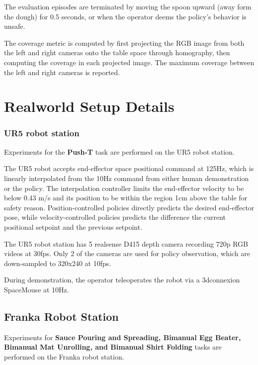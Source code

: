 \documentclass[Afour,sageh,times]{sagej}
\begin{document}
The evaluation episodes are terminated by moving the spoon upward (away form the dough) for 0.5 seconds, or when the operator deems the policy's behavior is unsafe.

The coverage metric is computed by first projecting the RGB image from both the left and right cameras onto the table space through homography, then computing the coverage in each projected image. The maximum coverage between the left and right cameras is reported.






\section{Realworld Setup Details}

\subsubsection{UR5 robot station}
\label{sec:ur5_setup}
Experiments for the \textbf{Push-T} task are performed on the UR5 robot station.

The UR5 robot accepts end-effector space positional command at 125Hz, which is linearly interpolated from the 10Hz command from either human demonstration or the policy. The interpolation controller limits the end-effector velocity to be below 0.43 m/s and its position to be within the region 1cm above the table for safety reason. Position-controlled policies directly predicts the desired end-effector pose, while velocity-controlled policies predicts the difference the current positional setpoint and the previous setpoint.

The UR5 robot station has 5 realsense D415 depth camera recording 720p RGB videos at 30fps. Only 2 of the cameras are used for policy observation, which are down-sampled to 320x240 at 10fps.

During demonstration, the operator teleoperates the robot via a 3dconnexion SpaceMouse at 10Hz.

\subsection{Franka Robot Station}
\label{sec:franka_setup}
Experiments for \textbf{Sauce Pouring and Spreading, Bimanual Egg Beater, Bimanual Mat Unrolling, and
Bimanual Shirt Folding} tasks are performed on the Franka robot station.
\end{document}
